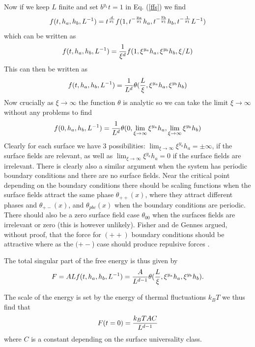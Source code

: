 Now if we keep $L$ finite and set $b^{y_1}t=1$ in Eq. (\ref{ffs}) we find
\begin{equation}
f(t,h_a,h_b,L^{-1}) = t^{d\over y_1}f(1, t^{-{y_a\over y_1}} h_a, t^{-{y_b\over y_1}} h_b, t^{-{1\over y_1}}L^{-1})
\label{ffs}
\end{equation}
which can be written as
\begin{equation}
f(t,h_a,h_b,L^{-1}) = {1\over \xi^d}f(1,\xi^{y_a} h_a, \xi^{y_b} h_b, \xi/L)
\end{equation}
This can then be written as
\begin{equation}
f(t,h_a,h_b,L^{-1}) = {1\over L^d}\theta({L\over \xi}, \xi^{y_a} h_a, \xi^{y_b} h_b)
\end{equation}
Now crucially as $\xi \to \infty$ the function $\theta$ is analytic so we can take the limit $\xi\to\infty$ without any problems to find
\begin{equation}
f(0,h_a,h_b,L^{-1}) = {1\over L^d}\theta(0, \lim_{\xi\to \infty} \xi^{y_a} h_a,\lim_{\xi\to \infty} \xi^{y_b} h_b)
\end{equation}
Clearly for each surface we have 3 possibilities: $\lim_{\xi\to \infty} \xi^{y_a} h_a = \pm \infty$, if the surface fields are relevant, as well as $\lim_{\xi\to \infty} \xi^{y_a} h_a = 0$ if the surface fields are irrelevant. There is clearly also a similar argument when the system has periodic boundary conditions and there are no surface fields. Near the critical point depending on the boundary conditions there should be scaling functions when the surface fields attract the same phase $\theta_{++}(x)$, where they attract different phases and
$\theta_{+-}(x)$, and $\theta_{pbc}(x)$ when the boundary conditions are periodic. There should also be a zero surface field case $\theta_{00}$ when the surfaces fields are irrelevant or zero (this is however unlikely). Fisher and de Gennes argued, without proof, that the force for $(++)$ boundary conditions should be attractive where as the $(+-$) case should produce repulsive forces \cite{gambassi_casimir_2009,gambassi_critical_2009} . 

The total singular part of the free energy is thus given by
\begin{equation}
F = ALf(t,h_a,h_b,L^{-1}) = {A\over L^{d-1}}\theta({L\over \xi}, \xi^{y_a} h_a, \xi^{y_b} h_b).
\end{equation}

The scale of the energy is set by the energy of thermal fluctuations $k_BT$ we thus find
that 
\begin{equation}
F(t=0) = {k_BT A C\over L^{d-1}}
\label{casfreeenergy}
\end{equation}
where $C$ is a constant depending on the surface universality class.


